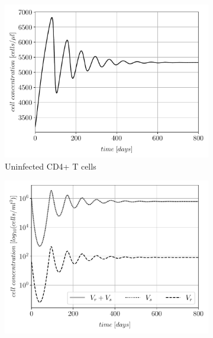 \begin{figure}
    \centering
    \begin{subfigure}[b]{0.475\textwidth}
        \centering
        \includegraphics[width=\textwidth]{images/eRT_04_alpha_02/treated_T.pdf}
        \caption[]%
        {{\small Uninfected CD4+ T cells}}    
        \label{fig2a:uninfected_T_cells}
    \end{subfigure}
    \begin{subfigure}[b]{0.475\textwidth}   
        \centering 
        \includegraphics[width=\textwidth]{images/eRT_04_alpha_02/treated_overview_V.pdf}

\end{subfigure}
\end{figure}
